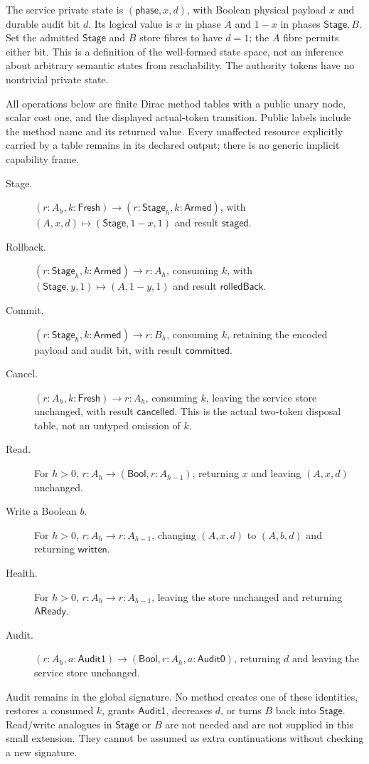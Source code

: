 \documentclass[11pt,a4paper]{article}
\theoremstyle{definition}
\begin{document}
The service private state is $(\mathsf{phase},x,d)$, with Boolean
physical payload $x$ and durable audit bit $d$. Its logical value is $x$
in phase $A$ and $1-x$ in phases $\mathsf{Stage},B$. Set the admitted
$\mathsf{Stage}$ and $B$ store fibres to have $d=1$; the $A$ fibre
permits either bit. This is a definition of the well-formed state space,
not an inference about arbitrary semantic states from reachability.
The authority tokens have no nontrivial private state.

All operations below are finite Dirac method tables with a public unary
node, scalar cost one, and the displayed actual-token transition. Public
labels include the method name and its returned value. Every unaffected
resource explicitly carried by a table remains in its declared output;
there is no generic implicit capability frame.
\begin{description}
\item[Stage.]
$(r:A_h,k:\mathsf{Fresh})\to(r:\mathsf{Stage}_h,k:\mathsf{Armed})$,
with $(A,x,d)\mapsto(\mathsf{Stage},1-x,1)$ and result
$\mathsf{staged}$.
\item[Rollback.]
$(r:\mathsf{Stage}_h,k:\mathsf{Armed})\to r:A_h$, consuming $k$,
with $(\mathsf{Stage},y,1)\mapsto(A,1-y,1)$ and result
$\mathsf{rolledBack}$.
\item[Commit.]
$(r:\mathsf{Stage}_h,k:\mathsf{Armed})\to r:B_h$, consuming $k$,
retaining the encoded payload and audit bit, with result
$\mathsf{committed}$.
\item[Cancel.]
$(r:A_h,k:\mathsf{Fresh})\to r:A_h$, consuming $k$, leaving the
service store unchanged, with result $\mathsf{cancelled}$. This is the
actual two-token disposal table, not an untyped omission of $k$.
\item[Read.]
For $h>0$, $r:A_h\to(\mathsf{Bool},r:A_{h-1})$, returning $x$ and
leaving $(A,x,d)$ unchanged.
\item[Write a Boolean $b$.]
For $h>0$, $r:A_h\to r:A_{h-1}$, changing $(A,x,d)$ to $(A,b,d)$
and returning $\mathsf{written}$.
\item[Health.]
For $h>0$, $r:A_h\to r:A_{h-1}$, leaving the store unchanged and
returning $\mathsf{AReady}$.
\item[Audit.]
$(r:A_h,a:\mathsf{Audit1})\to(\mathsf{Bool},r:A_h,a:\mathsf{Audit0})$,
returning $d$ and leaving the service store unchanged.
\end{description}
Audit remains in the global signature. No method creates one of these
identities, restores a consumed $k$, grants $\mathsf{Audit1}$, decreases
$d$, or turns $B$ back into $\mathsf{Stage}$. Read/write analogues in
$\mathsf{Stage}$ or $B$ are not needed and are not supplied in this
small extension. They cannot be assumed as extra continuations without
checking a new signature.
\end{document}

